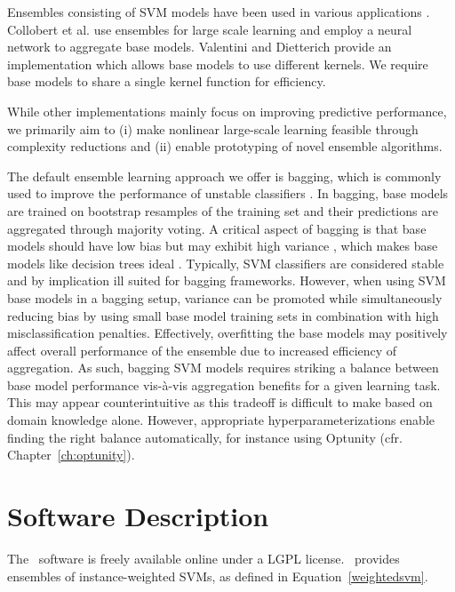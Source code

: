 Ensembles consisting of SVM models have been used in various applications
\citep{Wang20096466,5646323,mordelet2011prodige}.
Collobert et al. \citep{Collobert02} use ensembles for large scale learning and employ a neural
network to aggregate base models.
Valentini and Dietterich \citep{Valentini03lowbias} provide an implementation which allows base models to use different kernels.
We require base models to share a single kernel function for efficiency. 

While other implementations mainly focus on improving predictive performance, we
primarily aim to (i) make nonlinear large-scale learning feasible through complexity reductions and (ii) enable prototyping of novel ensemble algorithms.

The default ensemble learning approach we offer is bagging, which is commonly used to improve the
performance of unstable classifiers \citep{Breiman:1996:BP:231986.231989}. In
bagging, base models are trained on bootstrap resamples of the training set
and their predictions are aggregated through majority voting. A critical aspect of bagging is that base models should have low bias but may exhibit high variance \citep{Breiman:1996:BP:231986.231989, bauer1999empirical, biasvariance}, which makes base models like decision trees ideal \citep{breiman2001random}. Typically, SVM classifiers are considered stable \citep{bousquet2002stability} and by implication ill suited for bagging frameworks. However, when using SVM base models in a bagging setup, variance can be promoted while simultaneously reducing bias by using small base model training sets in combination with high misclassification penalties. Effectively, overfitting the base models may positively affect overall performance of the ensemble due to increased efficiency of aggregation. As such, bagging SVM models requires striking a balance between base model performance vis-\`a-vis aggregation benefits for a given learning task. This may appear counterintuitive as this tradeoff is difficult to make based on domain knowledge alone. However, appropriate hyperparameterizations enable finding the right balance automatically, for instance using Optunity (cfr. Chapter~\ref{ch:optunity}).

\section{Software Description}
The \esvm\ software is freely available online under a
LGPL license. \esvm\ provides ensembles of
instance-weighted SVMs, as defined in Equation~\eqref{weightedsvm}.

